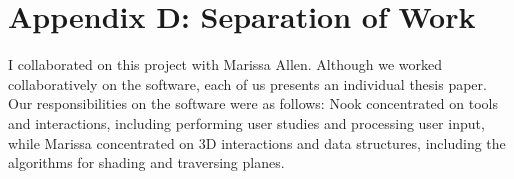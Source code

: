 \section{Appendix D: Separation of
Work}\label{appendix-d-separation-of-work}

I collaborated on this project with Marissa Allen. Although we worked
collaboratively on the software, each of us presents an individual
thesis paper. Our responsibilities on the software were as follows: Nook
concentrated on tools and interactions, including performing user
studies and processing user input, while Marissa concentrated on 3D
interactions and data structures, including the algorithms for shading
and traversing planes.
